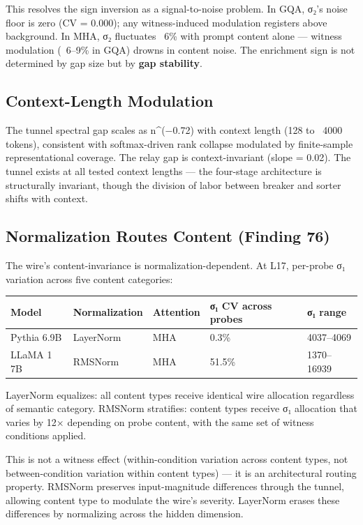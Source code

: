 \documentclass[12pt]{article}
\begin{document}
This resolves the sign inversion as a signal-to-noise problem. In GQA, σ₂'s noise floor is zero (CV = 0.000); any witness-induced modulation registers above background. In MHA, σ₂ fluctuates ~6\% with prompt content alone — witness modulation (~6–9\% in GQA) drowns in content noise. The enrichment sign is not determined by gap size but by \textbf{gap stability}.

\subsection{Context-Length Modulation}

The tunnel spectral gap scales as n^(−0.72) with context length (128 to ~4000 tokens), consistent with softmax-driven rank collapse modulated by finite-sample representational coverage. The relay gap is context-invariant (slope = 0.02). The tunnel exists at all tested context lengths — the four-stage architecture is structurally invariant, though the division of labor between breaker and sorter shifts with context.

\subsection{Normalization Routes Content (Finding 76)}

The wire's content-invariance is normalization-dependent. At L17, per-probe σ₁ variation across five content categories:

\begin{table}[h]
\centering
\small
\begin{tabular}{lllll}
\toprule
\textbf{Model} & \textbf{Normalization} & \textbf{Attention} & \textbf{σ₁ CV across probes} & \textbf{σ₁ range} \\
\midrule
Pythia 6.9B & LayerNorm & MHA & 0.3\% & 4037–4069 \\
LLaMA 1 7B & RMSNorm & MHA & 51.5\% & 1370–16939 \\
\bottomrule
\end{tabular}
\end{table}


LayerNorm equalizes: all content types receive identical wire allocation regardless of semantic category. RMSNorm stratifies: content types receive σ₁ allocation that varies by 12× depending on probe content, with the same set of witness conditions applied.

This is not a witness effect (within-condition variation across content types, not between-condition variation within content types) — it is an architectural routing property. RMSNorm preserves input-magnitude differences through the tunnel, allowing content type to modulate the wire's severity. LayerNorm erases these differences by normalizing across the hidden dimension.
\end{document}
